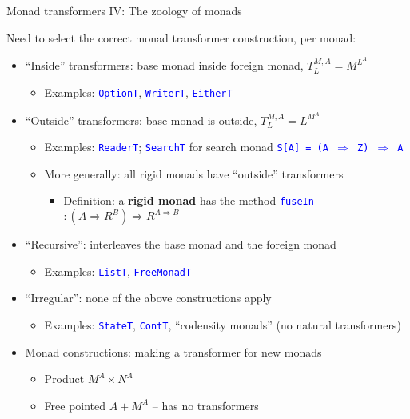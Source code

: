 \documentclass[english]{beamer}
\begin{document}
\begin{frame}{Monad transformers IV: The zoology of monads}

Need to select the correct monad transformer construction, per monad:
\begin{itemize}
\item ``Inside'' transformers: base monad inside foreign monad, $T_{L}^{M,A}=M^{L^{A}}$
\begin{itemize}
\item Examples: \texttt{\textcolor{blue}{\footnotesize{}OptionT}}, \texttt{\textcolor{blue}{\footnotesize{}WriterT}},
\texttt{\textcolor{blue}{\footnotesize{}EitherT}} 
\end{itemize}
\item ``Outside'' transformers: base monad is outside, $T_{L}^{M,A}=L^{M^{A}}$
\begin{itemize}
\item Examples: \texttt{\textcolor{blue}{\footnotesize{}ReaderT}}; \texttt{\textcolor{blue}{\footnotesize{}SearchT}}
for search monad \texttt{\textcolor{blue}{\footnotesize{}S{[}A{]}
= (A $\Rightarrow$ Z) $\Rightarrow$ A}} 
\item More generally: all rigid monads have ``outside'' transformers
\begin{itemize}
\item Definition: a \textbf{rigid monad} has the method \texttt{\textcolor{blue}{\footnotesize{}fuseIn}}$:\left(A\Rightarrow R^{B}\right)\Rightarrow R^{A\Rightarrow B}$
\end{itemize}
\end{itemize}
\item ``Recursive'': interleaves the base monad and the foreign monad
\begin{itemize}
\item Examples: \texttt{\textcolor{blue}{\footnotesize{}ListT}}, \texttt{\textcolor{blue}{\footnotesize{}FreeMonadT}} 
\end{itemize}
\item ``Irregular'': none of the above constructions apply
\begin{itemize}
\item Examples: \texttt{\textcolor{blue}{\footnotesize{}StateT}}, \texttt{\textcolor{blue}{\footnotesize{}ContT}},
``codensity monads'' (no natural transformers)
\end{itemize}
\item Monad constructions: making a transformer for new monads
\begin{itemize}
\item Product $M^{A}\times N^{A}$
\item Free pointed $A+M^{A}$ -- has no transformers
\end{itemize}
\end{itemize}
\end{frame}
\end{document}
